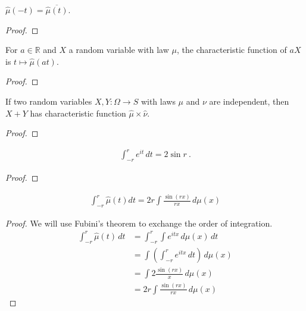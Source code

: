 \begin{lemma}\label{lem:charFun_neg}
 \mathlibok
{}
$\hat{\mu}(-t) = \overline{\hat{\mu}(t)}$.
\end{lemma}

\begin{proof}\leanok
\end{proof}


\begin{lemma}\label{lem:charFun_smul}
\mathlibok
{}
For $a \in \mathbb{R}$ and $X$ a random variable with law $\mu$, the characteristic function of $a X$ is $t \mapsto \hat{\mu}(at)$.
\end{lemma}

\begin{proof}\leanok
\end{proof}


\begin{lemma}\label{lem:charFun_add_of_indep}
\mathlibok
{}
If two random variables $X, Y : \Omega \to S$ with laws $\mu$ and $\nu$ are independent, then $X+Y$ has characteristic function $\hat{\mu} \times \hat{\nu}$.
\end{lemma}

\begin{proof}\leanok
\end{proof}


\begin{lemma}\label{lem:integral_exp_I}
\mathlibok
{}
\begin{align*}
    \int_{-r}^r e^{i t} \, d t = 2 \sin r \: .
\end{align*}
\end{lemma}

\begin{proof}\leanok
\end{proof}


\begin{lemma}\label{lem:integral_charFun}
\mathlibok
{}
\begin{align*}
    \int_{-r}^r \hat{\mu}(t) dt = 2 r \int \frac{\sin(r x)}{r x} \, d\mu(x)
\end{align*}
\end{lemma}

\begin{proof}
\leanok
We will use Fubini's theorem to exchange the order of integration.
\begin{align*}
    \int_{-r}^r \hat{\mu}(t) \, dt
    &= \int_{-r}^r \int e^{i t x} \, d\mu(x) \, dt
    \\
    &= \int \left( \int_{-r}^r e^{i t x} \, dt \right) \, d\mu(x)
    \\
    &= \int 2 \frac{\sin(r x)}{x} \, d\mu(x)
    \\
    &= 2 r \int \frac{\sin(r x)}{r x} \, d\mu(x)
\end{align*}
\end{proof}


